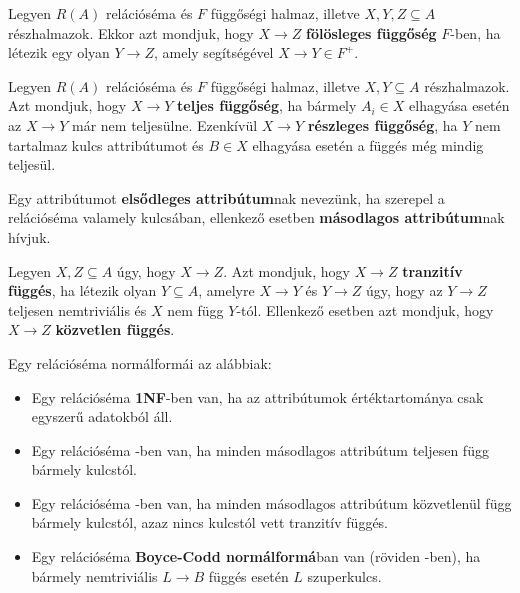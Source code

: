 \begin{defi}
Legyen $R(A)$ relációséma és $F$ függőségi halmaz, illetve $X,Y,Z \subseteq A$ részhalmazok. Ekkor azt mondjuk, hogy $X \longrightarrow Z$ \textbf{fölösleges függőség} $F$-ben, ha létezik egy olyan $Y \longrightarrow Z$, amely segítségével $X \longrightarrow Y \in F^+$.
\end{defi}

\begin{defi}
Legyen $R(A)$ relációséma és $F$ függőségi halmaz, illetve $X,Y \subseteq A$ részhalmazok. Azt mondjuk, hogy $X \longrightarrow Y$ \textbf{teljes függőség}, ha bármely $A_i \in X$ elhagyása esetén az $X \longrightarrow Y$ már nem teljesülne. Ezenkívül $X \longrightarrow Y$ \textbf{részleges függőség}, ha $Y$ nem tartalmaz kulcs attribútumot és $B \in X$ elhagyása esetén a függés még mindig teljesül.
\end{defi}

\begin{defi}
Egy attribútumot \textbf{elsődleges attribútum}nak nevezünk, ha szerepel a relációséma valamely kulcsában, ellenkező esetben \textbf{másodlagos attribútum}nak hívjuk.
\end{defi}

\begin{defi}
Legyen $X,Z \subseteq A$ úgy, hogy $X \longrightarrow Z$. Azt mondjuk, hogy $X \longrightarrow Z$ \textbf{tranzitív függés}, ha létezik olyan $Y \subseteq A$, amelyre $X \longrightarrow Y$ és $Y \longrightarrow Z$ úgy, hogy az $Y \longrightarrow Z$ teljesen nemtriviális és $X$ nem függ $Y$-tól. Ellenkező esetben azt mondjuk, hogy $X \longrightarrow Z$ \textbf{közvetlen függés}.
\end{defi}

\begin{defi}[Normálformák]
Egy relációséma normálformái az alábbiak:
\begin{itemize}
    \item Egy relációséma \textbf{1NF}-ben van, ha az attribútumok értéktartománya csak egyszerű adatokból áll.
    \item Egy relációséma \nfk-ben van, ha minden másodlagos attribútum teljesen függ bármely kulcstól.
    \item Egy relációséma \nfh-ben van, ha minden másodlagos attribútum közvetlenül függ bármely kulcstól, azaz nincs kulcstól vett tranzitív függés.
    \item Egy relációséma \textbf{Boyce-Codd normálformá}ban van (röviden \BCNF-ben), ha bármely nemtriviális $L \longrightarrow B$ függés esetén $L$ szuperkulcs.
\end{itemize}
\end{defi}

